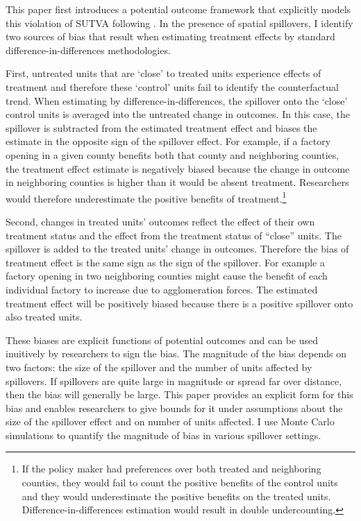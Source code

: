 \documentclass[11pt]{article}
\begin{document}
This paper first introduces a potential outcome framework that explicitly models this violation of SUTVA following \citet{Vazquez-Bare_2019}. In the presence of spatial spillovers, I identify two sources of bias that result when estimating treatment effects by standard difference-in-differences methodologies.

First, untreated units that are `close' to treated units experience effects of treatment and therefore these `control' units fail to identify the counterfactual trend. When estimating by difference-in-differences, the spillover onto the `close' control units is averaged into the untreated change in outcomes. In this case, the spillover is subtracted from the estimated treatment effect and biases the estimate in the opposite sign of the spillover effect. For example, if a factory opening in a given county benefits both that county and neighboring counties, the treatment effect estimate is negatively biased because the change in outcome in neighboring counties is higher than it would be absent treatment. Researchers would therefore underestimate the positive benefits of treatment.\footnote{If the policy maker had preferences over both treated and neighboring counties, they would fail to count the positive benefits of the control units and they would underestimate the positive benefits on the treated units. Difference-in-differences estimation would result in double undercounting.}

Second, changes in treated units' outcomes reflect the effect of their own treatment status and the effect from the treatment status of ``close'' units. The spillover is added to the treated units' change in outcomes. Therefore the bias of treatment effect is the same sign as the sign of the spillover. For example a factory opening in two neighboring counties might cause the benefit of each individual factory to increase due to agglomeration forces. The estimated treatment effect will be positively biased because there is a positive spillover onto also treated units. 

These biases are explicit functions of potential outcomes and can be used inuitively by researchers to sign the bias. The magnitude of the bias depends on two factors: the size of the spillover and the number of units affected by spillovers. If spillovers are quite large in magnitude or spread far over distance, then the bias will generally be large. This paper provides an explicit form for this bias and enables researchers to give bounds for it under assumptions about the size of the spillover effect and on number of units affected. I use Monte Carlo simulations to quantify the magnitude of bias in various spillover settings.
\end{document}
